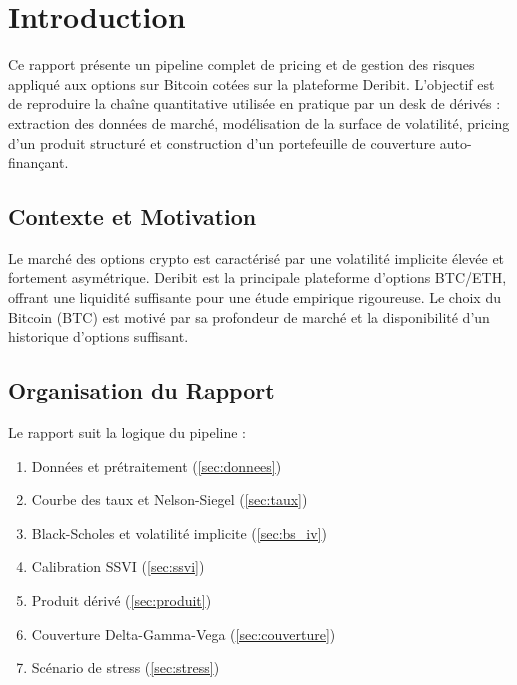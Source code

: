 \section{Introduction}

Ce rapport présente un pipeline complet de pricing et de gestion des risques
appliqué aux options sur Bitcoin cotées sur la plateforme Deribit.
L'objectif est de reproduire la chaîne quantitative utilisée en pratique par
un desk de dérivés : extraction des données de marché, modélisation de la
surface de volatilité, pricing d'un produit structuré et construction d'un
portefeuille de couverture auto-finançant.

\subsection{Contexte et Motivation}

Le marché des options crypto est caractérisé par une volatilité implicite
élevée et fortement asymétrique. Deribit est la principale plateforme d'options
BTC/ETH, offrant une liquidité suffisante pour une étude empirique rigoureuse.
Le choix du Bitcoin (BTC) est motivé par sa profondeur de marché et la
disponibilité d'un historique d'options suffisant.

\subsection{Organisation du Rapport}

Le rapport suit la logique du pipeline :
\begin{enumerate}
  \item Données et prétraitement (\cref{sec:donnees})
  \item Courbe des taux et Nelson-Siegel (\cref{sec:taux})
  \item Black-Scholes et volatilité implicite (\cref{sec:bs_iv})
  \item Calibration SSVI (\cref{sec:ssvi})
  \item Produit dérivé (\cref{sec:produit})
  \item Couverture Delta-Gamma-Vega (\cref{sec:couverture})
  \item Scénario de stress (\cref{sec:stress})
\end{enumerate}
